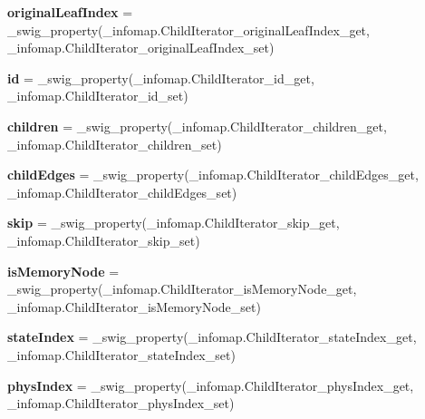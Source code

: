 \begin{DoxyCompactItemize}
\item 
\mbox{\label{classinfomapfolder_1_1infomap_1_1ChildIterator_a8b93d6dafb9cf213faa0c65f67673b8a}} 
{\bfseries original\+Leaf\+Index} = \+\_\+swig\+\_\+property(\+\_\+infomap.\+Child\+Iterator\+\_\+original\+Leaf\+Index\+\_\+get, \+\_\+infomap.\+Child\+Iterator\+\_\+original\+Leaf\+Index\+\_\+set)
\item 
\mbox{\label{classinfomapfolder_1_1infomap_1_1ChildIterator_a21fd2eccd06294a4e278182782778de2}} 
{\bfseries id} = \+\_\+swig\+\_\+property(\+\_\+infomap.\+Child\+Iterator\+\_\+id\+\_\+get, \+\_\+infomap.\+Child\+Iterator\+\_\+id\+\_\+set)
\item 
\mbox{\label{classinfomapfolder_1_1infomap_1_1ChildIterator_a561cdbf75915b6a087af59a13fde9840}} 
{\bfseries children} = \+\_\+swig\+\_\+property(\+\_\+infomap.\+Child\+Iterator\+\_\+children\+\_\+get, \+\_\+infomap.\+Child\+Iterator\+\_\+children\+\_\+set)
\item 
\mbox{\label{classinfomapfolder_1_1infomap_1_1ChildIterator_a7e01fef5759f0e7a11624578d0b2d56a}} 
{\bfseries child\+Edges} = \+\_\+swig\+\_\+property(\+\_\+infomap.\+Child\+Iterator\+\_\+child\+Edges\+\_\+get, \+\_\+infomap.\+Child\+Iterator\+\_\+child\+Edges\+\_\+set)
\item 
\mbox{\label{classinfomapfolder_1_1infomap_1_1ChildIterator_a9ce8d09e42d0e57f1ca8f7952342028d}} 
{\bfseries skip} = \+\_\+swig\+\_\+property(\+\_\+infomap.\+Child\+Iterator\+\_\+skip\+\_\+get, \+\_\+infomap.\+Child\+Iterator\+\_\+skip\+\_\+set)
\item 
\mbox{\label{classinfomapfolder_1_1infomap_1_1ChildIterator_a1db891bf2b800af3d13daeadf2a123e0}} 
{\bfseries is\+Memory\+Node} = \+\_\+swig\+\_\+property(\+\_\+infomap.\+Child\+Iterator\+\_\+is\+Memory\+Node\+\_\+get, \+\_\+infomap.\+Child\+Iterator\+\_\+is\+Memory\+Node\+\_\+set)
\item 
\mbox{\label{classinfomapfolder_1_1infomap_1_1ChildIterator_ad6ff82e2eacee4780e6546dfd9a92887}} 
{\bfseries state\+Index} = \+\_\+swig\+\_\+property(\+\_\+infomap.\+Child\+Iterator\+\_\+state\+Index\+\_\+get, \+\_\+infomap.\+Child\+Iterator\+\_\+state\+Index\+\_\+set)
\item 
\mbox{\label{classinfomapfolder_1_1infomap_1_1ChildIterator_aed84e9149e7dd8ef0c4e005bf03f05e6}} 
{\bfseries phys\+Index} = \+\_\+swig\+\_\+property(\+\_\+infomap.\+Child\+Iterator\+\_\+phys\+Index\+\_\+get, \+\_\+infomap.\+Child\+Iterator\+\_\+phys\+Index\+\_\+set)
\end{DoxyCompactItemize}


